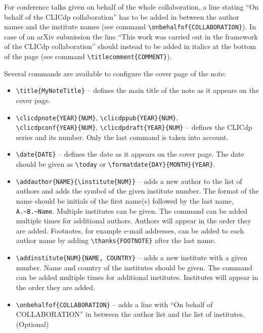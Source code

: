 For conference talks given on behalf of the whole collaboration, a line stating ``On behalf of the CLICdp collaboration'' has to be added in between the author names and the institute names (see command \texttt{\textbackslash onbehalfof\{COLLABORATION\}}). In case of an arXiv submission the line ``This work was carried out in the framework of the CLICdp collaboration'' should instead to be added in italics at the bottom of the page (see command \texttt{\textbackslash titlecomment\{COMMENT\}}).

Several \latex commands are available to configure the cover page of the note:
\begin{itemize}
  \item \texttt{\textbackslash title\{MyNoteTitle\}} -- defines the main title of the note as it appears on the cover page.
  \item \texttt{\textbackslash clicdpnote\{YEAR\}\{NUM\}}, \texttt{\textbackslash clicdppub\{YEAR\}\{NUM\}},\\\texttt{\textbackslash clicdpconf\{YEAR\}\{NUM\}}, \texttt{\textbackslash clicdpdraft\{YEAR\}\{NUM\}} -- defines the CLICdp series and its number. Only the last command is taken into account.
  \item \texttt{\textbackslash date\{DATE\}} -- defines the date as it appears on the cover page. The date should be given as \texttt{\textbackslash today} or \texttt{\textbackslash formatdate\{DAY\}\{MONTH\}\{YEAR\}}.
  \item \texttt{\textbackslash addauthor\{NAME\}\{\textbackslash institute\{NUM\}\}} -- adds a new author to the list of authors and adds the symbol of the given institute number. The format of the name should be initials of the first name(s) followed by the last name, \ie \texttt{A.\textasciitilde B.\textasciitilde Name}. Multiple institutes can be given. The command can be added multiple times for additional authors. Authors will appear in the order they are added. Footnotes, for example e-mail addresses, can be added to each author name by adding \texttt{\textbackslash thanks\{FOOTNOTE\}} after the last name.
  \item \texttt{\textbackslash addinstitute\{NUM\}\{NAME, COUNTRY\}} -- adds a new institute with a given number. Name and country of the institutes should be given. The command can be added multiple times for additional institutes. Institutes will appear in the order they are added.
  \item \texttt{\textbackslash onbehalfof\{COLLABORATION\}} -- adds a line with ``On behalf of COLLABORATION'' in between the author list and the list of institutes. (Optional)

\end{itemize}
